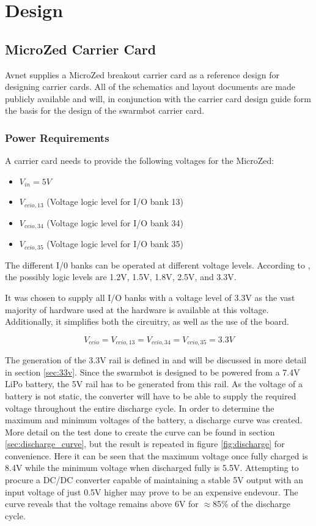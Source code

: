 \section{Design}
\subsection{MicroZed Carrier Card}
\label{sub:microzed_carrier_card}
Avnet supplies a MicroZed breakout carrier card as a reference design for designing carrier cards.
All of the schematics and layout documents are made publicly available and will, in conjunction with the carrier card design guide \cite{design_carrier} form the basis for the design of the swarmbot carrier card.

\subsubsection*{Power Requirements}
\label{sub:power_req}
A carrier card  needs to provide the following voltages for the MicroZed:
\begin{itemize}
	\item $V_{in} = 5V$
	\item $V_{ccio,13}$ (Voltage logic level for I/O bank 13)
	\item $V_{ccio,34}$ (Voltage logic level for I/O bank 34)
	\item $V_{ccio,35}$ (Voltage logic level for I/O bank 35)
\end{itemize}
The different I/0 banks can be operated at different voltage levels.
According to \cite{zynq_dc}, the possibly logic levels are 1.2V, 1.5V, 1.8V, 2.5V, and 3.3V.

It was chosen to supply all I/O banks with a voltage level of 3.3V as the vast majority of hardware used at the hardware is available at this voltage.
Additionally, it simplifies both the circuitry, as well as the use of the board.

$$ V_{ccio} =  V_{ccio,13} = V_{ccio,34} = V_{ccio,35} = 3.3V$$

The generation of the 3.3V rail is defined in \cite{carrier_schematic} and will be discussed in more detail in section \ref{sec:33v}.
Since the swarmbot is designed to be powered from a 7.4V LiPo battery, the 5V rail has to be generated from this rail.
As the voltage of a battery is not static, the converter will have to be able to supply the required voltage throughout the entire discharge cycle.
In order to determine the maximum and minimum voltages of the battery, a discharge curve was created.
More detail on the test done to create the curve can be found in section \ref{sec:discharge_curve}, but the result is repeated in figure \ref{fig:discharge} for convenience.
Here it can be seen that the maximum voltage once fully charged is 8.4V while the minimum voltage when discharged fully is 5.5V.
Attempting to procure a DC/DC converter capable of maintaining a stable 5V output with an input voltage of just 0.5V higher may prove to be an expensive endevour.
The curve reveals that the voltage remains above 6V for $\approx$85\% of the discharge cycle. 


